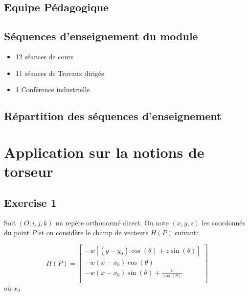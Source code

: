 \documentclass[
]{book}
\providecommand{\tightlist}{%
  \setlength{\itemsep}{0pt}\setlength{\parskip}{0pt}}
\begin{document}
\hypertarget{equipe-puxe9dagogique}{%
\section*{Equipe Pédagogique}\label{equipe-puxe9dagogique}}

\hypertarget{suxe9quences-denseignement-du-module}{%
\section*{Séquences d'enseignement du module}\label{suxe9quences-denseignement-du-module}}

\begin{itemize}
\tightlist
\item
  12 séances de cours
\item
  11 séances de Travaux dirigés
\item
  1 Conférence industrielle
\end{itemize}

\hypertarget{ruxe9partition-des-suxe9quences-denseignement}{%
\section*{Répartition des séquences d'enseignement}\label{ruxe9partition-des-suxe9quences-denseignement}}

\hypertarget{application-sur-la-notions-de-torseur}{%
\chapter{Application sur la notions de torseur}\label{application-sur-la-notions-de-torseur}}

\hypertarget{exercise-1}{%
\section{Exercise 1}\label{exercise-1}}

Soit \((O;i, j, k)\) un repère orthonormé direct. On note \((x, y, z)\) les coordonnés du point \(P\) et on considère le champ de vecteurs \(H(P)\) suivant:

\[
H(P) = 
\begin{bmatrix}
-w[(y - y_{0}) \cos(\theta) + z\sin(\theta) ] \\
-w(x - x_{0}) \cos(\theta) \\
-w(x - x_{0}) \sin(\theta) + \frac{v}{\cos(\theta)} \\
\end{bmatrix}
\]
où \(x_{0}\)
\end{document}
